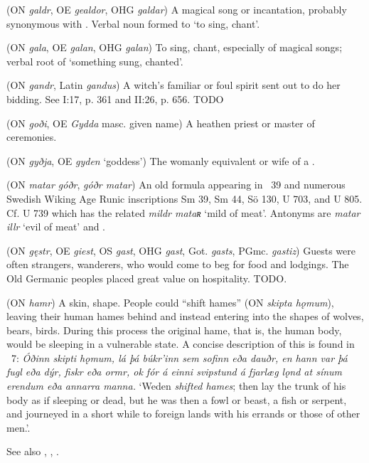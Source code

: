 \begin{itemize}
 (ON \emph{galdr}, OE \emph{gealdor}, OHG \emph{galdar})
  A magical song or incantation, probably synonymous with .  Verbal noun formed to  ‘to sing, chant’.

 (ON \emph{gala}, OE \emph{galan}, OHG \emph{galan})
  To sing, chant, especially of magical songs; verbal root of  ‘something sung, chanted’.

 (ON \emph{gandr}, Latin \emph{gandus})
  A witch’s familiar or foul spirit sent out to do her bidding. See  I:17, p. 361 and II:26, p. 656. TODO

 (ON \emph{goði}, OE \emph{Gydda} masc. given name)
  A heathen priest or master of ceremonies.

 (ON \emph{gyðja}, OE \emph{gyden} ‘goddess’)
  The womanly equivalent or wife of a .

 (ON \emph{matar góðr}, \emph{góðr matar})
   An old formula appearing in \Havamal\ 39 and numerous Swedish Wiking Age Runic inscriptions Sm 39, Sm 44, Sö 130, U 703, and U 805.  Cf. U 739 which has the related \emph{mildr mataʀ} ‘mild of meat’.  Antonyms are \emph{matar illr} ‘evil of meat’ and .

 (ON \emph{gęstr}, OE \emph{giest}, OS \emph{gast}, OHG \emph{gast}, Got. \emph{gasts}, PGmc. \emph{gastiz})
  Guests were often strangers, wanderers, who would come to beg for food and lodgings.  The Old Germanic peoples placed great value on hospitality. TODO.

 (ON \emph{hamr})
  A skin, shape. People could “shift hames” (ON \emph{skipta hǫmum}), leaving their human hames behind and instead entering into the shapes of wolves, bears, birds.  During this process the original hame, that is, the human body, would be sleeping in a vulnerable state. A concise description of this is found in \YnglingaSaga\ 7: \emph{Óðinn \emph{skipti hǫmum}, lá þá búkr’inn sem sofinn eða dauðr, en hann var þá fugl eða dýr, fiskr eða ormr, ok fór á einni svipstund á fjarlæg lǫnd at sínum erendum eða annarra manna.} ‘Weden \emph{shifted hames}; then lay the trunk of his body as if sleeping or dead, but he was then a fowl or beast, a fish or serpent, and journeyed in a short while to foreign lands with his errands or those of other men.’.

  See also , , .


\end{itemize}
